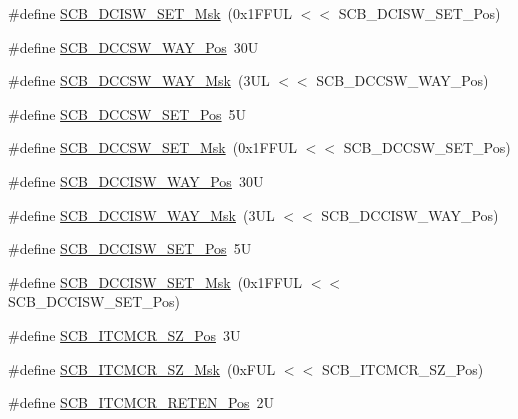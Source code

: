 \begin{DoxyCompactItemize}
\#define \hyperlink{group___c_m_s_i_s___s_c_b_gab08fbef94f7d068a7c0217e074c697f9}{S\-C\-B\-\_\-\-D\-C\-I\-S\-W\-\_\-\-S\-E\-T\-\_\-\-Msk}~(0x1\-F\-F\-U\-L $<$$<$ S\-C\-B\-\_\-\-D\-C\-I\-S\-W\-\_\-\-S\-E\-T\-\_\-\-Pos)
\item 
\#define \hyperlink{group___c_m_s_i_s___s_c_b_ga6cac2d69791e13af276d8306c796925f}{S\-C\-B\-\_\-\-D\-C\-C\-S\-W\-\_\-\-W\-A\-Y\-\_\-\-Pos}~30\-U
\item 
\#define \hyperlink{group___c_m_s_i_s___s_c_b_ga8374e67655ac524284c9bb59eb2efa23}{S\-C\-B\-\_\-\-D\-C\-C\-S\-W\-\_\-\-W\-A\-Y\-\_\-\-Msk}~(3\-U\-L $<$$<$ S\-C\-B\-\_\-\-D\-C\-C\-S\-W\-\_\-\-W\-A\-Y\-\_\-\-Pos)
\item 
\#define \hyperlink{group___c_m_s_i_s___s_c_b_gae93985adc38a127bc8dc909ac58e8fea}{S\-C\-B\-\_\-\-D\-C\-C\-S\-W\-\_\-\-S\-E\-T\-\_\-\-Pos}~5\-U
\item 
\#define \hyperlink{group___c_m_s_i_s___s_c_b_ga669e16d98c8ea0e66afb04641971d98c}{S\-C\-B\-\_\-\-D\-C\-C\-S\-W\-\_\-\-S\-E\-T\-\_\-\-Msk}~(0x1\-F\-F\-U\-L $<$$<$ S\-C\-B\-\_\-\-D\-C\-C\-S\-W\-\_\-\-S\-E\-T\-\_\-\-Pos)
\item 
\#define \hyperlink{group___c_m_s_i_s___s_c_b_gaa90bd0b36679219d6a2144eba6eb96cd}{S\-C\-B\-\_\-\-D\-C\-C\-I\-S\-W\-\_\-\-W\-A\-Y\-\_\-\-Pos}~30\-U
\item 
\#define \hyperlink{group___c_m_s_i_s___s_c_b_gaf2269bbe0bc7705e1da8f5ee0f581054}{S\-C\-B\-\_\-\-D\-C\-C\-I\-S\-W\-\_\-\-W\-A\-Y\-\_\-\-Msk}~(3\-U\-L $<$$<$ S\-C\-B\-\_\-\-D\-C\-C\-I\-S\-W\-\_\-\-W\-A\-Y\-\_\-\-Pos)
\item 
\#define \hyperlink{group___c_m_s_i_s___s_c_b_ga525f1bb9849e89b3eafbd53dcd51e296}{S\-C\-B\-\_\-\-D\-C\-C\-I\-S\-W\-\_\-\-S\-E\-T\-\_\-\-Pos}~5\-U
\item 
\#define \hyperlink{group___c_m_s_i_s___s_c_b_gaf1b0bea5ab77d4ad7d5c21e77ca463ad}{S\-C\-B\-\_\-\-D\-C\-C\-I\-S\-W\-\_\-\-S\-E\-T\-\_\-\-Msk}~(0x1\-F\-F\-U\-L $<$$<$ S\-C\-B\-\_\-\-D\-C\-C\-I\-S\-W\-\_\-\-S\-E\-T\-\_\-\-Pos)
\item 
\#define \hyperlink{group___c_m_s_i_s___s_c_b_ga86b58242b8286aba9318e2062d88f341}{S\-C\-B\-\_\-\-I\-T\-C\-M\-C\-R\-\_\-\-S\-Z\-\_\-\-Pos}~3\-U
\item 
\#define \hyperlink{group___c_m_s_i_s___s_c_b_ga2aca0f00fd91071567dfa596eaa136de}{S\-C\-B\-\_\-\-I\-T\-C\-M\-C\-R\-\_\-\-S\-Z\-\_\-\-Msk}~(0x\-F\-U\-L $<$$<$ S\-C\-B\-\_\-\-I\-T\-C\-M\-C\-R\-\_\-\-S\-Z\-\_\-\-Pos)
\item 
\#define \hyperlink{group___c_m_s_i_s___s_c_b_ga1094e5655c0e9572ecd562fa4a7d5f21}{S\-C\-B\-\_\-\-I\-T\-C\-M\-C\-R\-\_\-\-R\-E\-T\-E\-N\-\_\-\-Pos}~2\-U

\end{DoxyCompactItemize}
